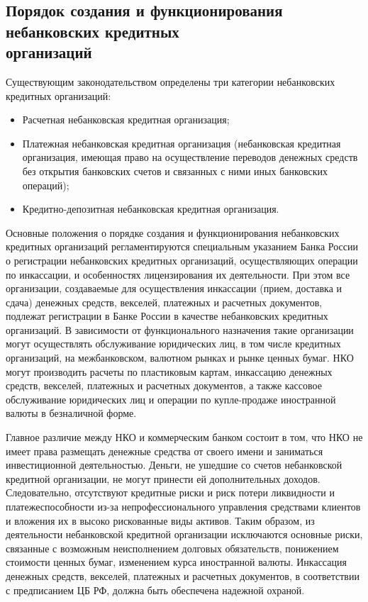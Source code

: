 \documentclass[a4paper,12pt,fleqn]{article} %
\begin{document}
\subsection{Порядок создания и функционирования небанковских кредитных \\организаций}

Существующим законодательством определены три категории небанковских кредитных организаций: 

\begin{itemize}
	\item Расчетная небанковская кредитная организация;
	\item Платежная небанковская кредитная организация (небанковская кредитная организация, имеющая право на осуществление переводов денежных средств без открытия банковских счетов и связанных с ними иных банковских операций);
	\item Кредитно-депозитная небанковская кредитная организация.
\end{itemize}

Основные положения о порядке создания и функционирования небанковских кредитных организаций регламентируются специальным указанием Банка России о регистрации небанковских кредитных организаций, осуществляющих операции по инкассации, и особенностях лицензирования их деятельности. При этом все   организации,   создаваемые  для  осуществления инкассации (прием,  доставка  и  сдача)  денежных средств,  векселей, платежных и расчетных документов,  подлежат регистрации в Банке России в качестве небанковских кредитных организаций. В зависимости от функционального назначения такие организации могут осуществлять обслуживание юридических лиц, в том числе кредитных организаций, на межбанковском, валютном рынках и рынке ценных бумаг. НКО могут производить расчеты по пластиковым картам, инкассацию денежных средств, векселей, платежных и расчетных документов, а также кассовое обслуживание юридических лиц и операции по купле-продаже иностранной валюты в безналичной форме. 

Главное различие между НКО и коммерческим банком состоит в том, что НКО не имеет права размещать денежные средства от своего имени и заниматься инвестиционной деятельностью. Деньги, не ушедшие со счетов небанковской кредитной организации, не могут принести ей дополнительных доходов. Следовательно, отсутствуют кредитные риски и риск потери ликвидности и платежеспособности из-за непрофессионального управления средствами клиентов и вложения их в высоко рискованные виды активов. Таким образом, из деятельности небанковской кредитной организации исключаются основные риски, связанные с возможным неисполнением долговых обязательств, понижением стоимости ценных бумаг, изменением курса иностранной валюты. Инкассация денежных средств,  векселей,  платежных и расчетных документов, в соответствии с предписанием ЦБ РФ, должна  быть  обеспечена  надежной  охраной.  
\end{document}
